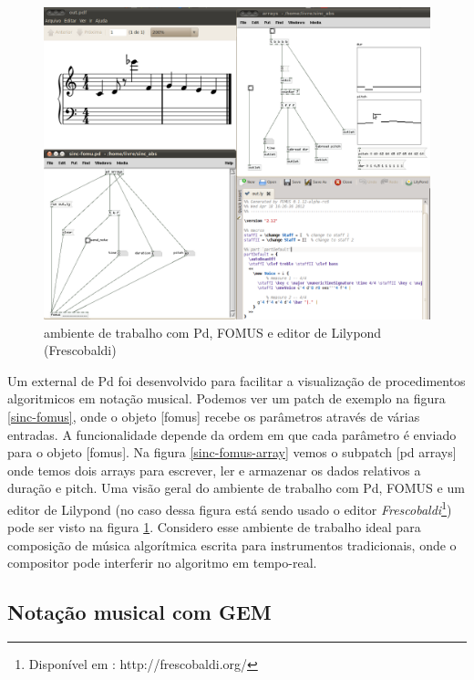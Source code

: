 \documentclass[draft]{ppgmus}
\begin{document}
\begin{figure}
\includegraphics[scale=.3]{trab-fomus}
\caption{ambiente de trabalho com Pd, FOMUS e editor de Lilypond (Frescobaldi)}
\label{trab-fomus}
\end{figure}




Um external de Pd foi desenvolvido para facilitar a visualização
de procedimentos algoritmicos em notação musical. Podemos ver um patch de
exemplo na figura \ref{sinc-fomus}, onde o objeto [fomus] recebe os parâmetros através
de várias entradas. A funcionalidade depende da ordem em que cada parâmetro
é enviado para o objeto [fomus]. Na figura \ref{sinc-fomus-array} vemos o subpatch [pd arrays]
onde temos dois arrays para escrever, ler e armazenar os dados relativos a
duração e pitch. Uma visão geral do ambiente de trabalho com Pd, FOMUS e 
um editor de Lilypond (no caso dessa figura está sendo usado o editor
\textit{Frescobaldi}\footnote{Disponível em : http://frescobaldi.org/}) pode ser visto na figura \ref{trab-fomus}.
Considero esse ambiente de trabalho ideal para composição de música algorítmica
escrita para instrumentos tradicionais, onde o compositor pode interferir no algoritmo em 
tempo-real.







\subsection{Notação musical com GEM}
\end{document}
